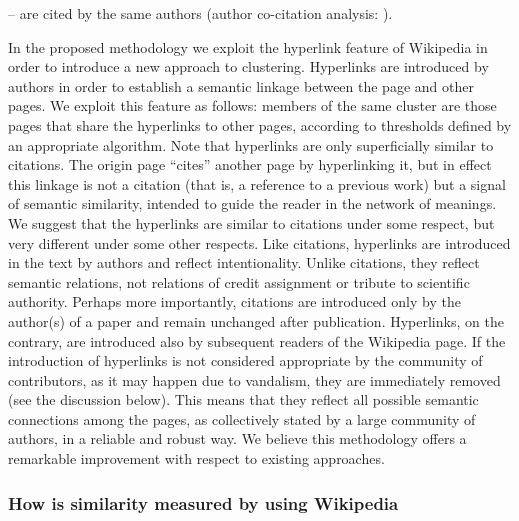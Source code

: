 \documentclass[]{book}
\begin{document}
-- are cited by the same authors (author co-citation analysis:
\citep{white1981author}).

In the proposed methodology we exploit the hyperlink feature of
Wikipedia in order to introduce a new approach to clustering. Hyperlinks
are introduced by authors in order to establish a semantic linkage
between the page and other pages. We exploit this feature as follows:
members of the same cluster are those pages that share the hyperlinks to
other pages, according to thresholds defined by an appropriate
algorithm. Note that hyperlinks are only superficially similar to
citations. The origin page ``cites'' another page by hyperlinking it,
but in effect this linkage is not a citation (that is, a reference to a
previous work) but a signal of semantic similarity, intended to guide
the reader in the network of meanings. We suggest that the hyperlinks
are similar to citations under some respect, but very different under
some other respects. Like citations, hyperlinks are introduced in the
text by authors and reflect intentionality. Unlike citations, they
reflect semantic relations, not relations of credit assignment or
tribute to scientific authority. Perhaps more importantly, citations are
introduced only by the author(s) of a paper and remain unchanged after
publication. Hyperlinks, on the contrary, are introduced also by
subsequent readers of the Wikipedia page. If the introduction of
hyperlinks is not considered appropriate by the community of
contributors, as it may happen due to vandalism, they are immediately
removed (see the discussion below). This means that they reflect all
possible semantic connections among the pages, as collectively stated by
a large community of authors, in a reliable and robust way. We believe
this methodology offers a remarkable improvement with respect to
existing approaches.

\subsubsection*{How is similarity measured by using
Wikipedia}\label{how-is-similarity-measured-by-using-wikipedia}
\end{document}
